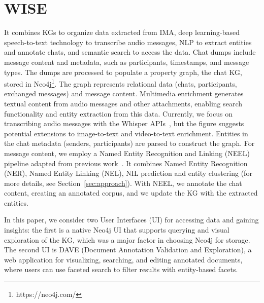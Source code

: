 \section{WISE}




It combines KGs to organize data extracted from IMA, deep learning-based speech-to-text technology to transcribe audio messages, NLP to extract entities and annotate chats, and semantic search to access the data.
Chat dumps include message content and metadata, such as participants, timestamps, and message types. The dumps are processed to populate a property graph, the chat KG, stored in Neo4j\footnote{https://neo4j.com/}. The graph represents relational data (chats, participants, exchanged messages) and message content. Multimedia enrichment generates textual content from audio messages and other attachments, enabling search functionality and entity extraction from this data. Currently, we focus on transcribing audio messages with the Whisper APIs~\cite{radford23a-whisper}, but the figure suggests potential extensions to image-to-text and video-to-text enrichment.
Entities in the chat metadata (senders, participants) are parsed to construct the graph. For message content, we employ a Named Entity Recognition and Linking (NEEL) pipeline adapted from previous work~\cite{ijckg2022,aixia_2023}.
It combines Named Entity Recognition (NER), Named Entity Linking (NEL), NIL prediction and entity clustering (for more details, see Section~\ref{sec:approach}).
With NEEL, we annotate the chat content, creating an annotated corpus, and we update the KG with the extracted entities.

In this paper, we consider two User Interfaces (UI) for accessing data and gaining insights:
the first is a native Neo4j UI that supports querying and visual exploration of the KG, which was a major factor in choosing Neo4j for storage. The second UI is DAVE (Document Annotation Validation and Exploration), a web application for visualizing, searching, and editing annotated documents, where users can use faceted search to filter results with entity-based facets. 

